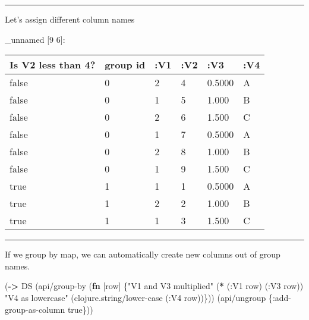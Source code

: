 \documentclass[]{article}
\newenvironment{Shaded}{\begin{snugshade}}{\end{snugshade}}
\newcommand{\KeywordTok}[1]{\textcolor[rgb]{0.13,0.29,0.53}{\textbf{#1}}}
\newcommand{\DecValTok}[1]{\textcolor[rgb]{0.00,0.00,0.81}{#1}}
\newcommand{\StringTok}[1]{\textcolor[rgb]{0.31,0.60,0.02}{#1}}
\newcommand{\VariableTok}[1]{\textcolor[rgb]{0.00,0.00,0.00}{#1}}
\newcommand{\AttributeTok}[1]{\textcolor[rgb]{0.77,0.63,0.00}{#1}}
\newcommand{\NormalTok}[1]{#1}
\begin{document}
\begin{center}\rule{0.5\linewidth}{0.5pt}\end{center}

Let's assign different column names

\begin{Shaded}
\end{Shaded}

\_unnamed {[}9 6{]}:

\begin{longtable}[]{@{}llllll@{}}
\toprule
Is V2 less than 4? & group id & :V1 & :V2 & :V3 & :V4\tabularnewline
\midrule
\endhead
false & 0 & 2 & 4 & 0.5000 & A\tabularnewline
false & 0 & 1 & 5 & 1.000 & B\tabularnewline
false & 0 & 2 & 6 & 1.500 & C\tabularnewline
false & 0 & 1 & 7 & 0.5000 & A\tabularnewline
false & 0 & 2 & 8 & 1.000 & B\tabularnewline
false & 0 & 1 & 9 & 1.500 & C\tabularnewline
true & 1 & 1 & 1 & 0.5000 & A\tabularnewline
true & 1 & 2 & 2 & 1.000 & B\tabularnewline
true & 1 & 1 & 3 & 1.500 & C\tabularnewline
\bottomrule
\end{longtable}

\begin{center}\rule{0.5\linewidth}{0.5pt}\end{center}

If we group by map, we can automatically create new columns out of group
names.

\begin{Shaded}
\begin{Highlighting}[]
\NormalTok{(}\KeywordTok{->}\NormalTok{ DS}
\NormalTok{    (api/group-by (}\KeywordTok{fn}\NormalTok{ [row] \{}\StringTok{"V1 and V3 multiplied"}\NormalTok{ (}\KeywordTok{*}\NormalTok{ (}\AttributeTok{:V1}\NormalTok{ row)}
\NormalTok{                                                      (}\AttributeTok{:V3}\NormalTok{ row))}
                            \StringTok{"V4 as lowercase"}\NormalTok{ (clojure.string/lower-case (}\AttributeTok{:V4}\NormalTok{ row))\}))}
\NormalTok{    (api/ungroup \{}\AttributeTok{:add-group-as-column} \VariableTok{true}\NormalTok{\}))}
\end{Highlighting}
\end{Shaded}
\end{document}
